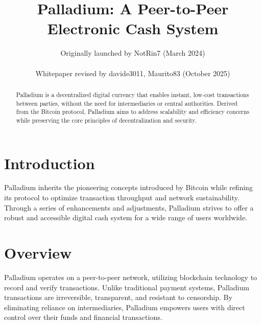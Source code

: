\documentclass[11pt,a4paper]{article}
\title{\textbf{Palladium: A Peer-to-Peer Electronic Cash System}}
\author{Originally launched by NotRin7 (March 2024) \\\\ Whitepaper revised by davide3011, Maurito83 (October 2025)}
\date{}
\begin{document}
\maketitle

\begin{abstract}
Palladium is a decentralized digital currency that enables instant, low-cost transactions between parties, without the need for intermediaries or central authorities. Derived from the Bitcoin protocol, Palladium aims to address scalability and efficiency concerns while preserving the core principles of decentralization and security.
\end{abstract}

\section{Introduction}
Palladium inherits the pioneering concepts introduced by Bitcoin while refining its protocol to optimize transaction throughput and network sustainability. Through a series of enhancements and adjustments, Palladium strives to offer a robust and accessible digital cash system for a wide range of users worldwide.

\section{Overview}
Palladium operates on a peer-to-peer network, utilizing blockchain technology to record and verify transactions. Unlike traditional payment systems, Palladium transactions are irreversible, transparent, and resistant to censorship. By eliminating reliance on intermediaries, Palladium empowers users with direct control over their funds and financial transactions.
\end{document}
